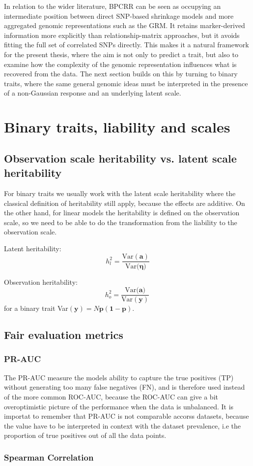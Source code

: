 In relation to the wider literature, BPCRR can be seen as occupying an intermediate position between direct SNP-based shrinkage models and more aggregated genomic representations such as the GRM. It retains marker-derived information more explicitly than relationship-matrix approaches, but it avoids fitting the full set of correlated SNPs directly. This makes it a natural framework for the present thesis, where the aim is not only to predict a trait, but also to examine how the complexity of the genomic representation influences what is recovered from the data. The next section builds on this by turning to binary traits, where the same general genomic ideas must be interpreted in the presence of a non-Gaussian response and an underlying latent scale.

\section{Binary traits, liability and scales}

\subsection{Observation scale heritability vs. latent scale heritability}

For binary traits we usually work with the latent scale heritability where the classical definition of heritability still apply, because the effects are additive. On the other hand, for linear models the heritability is defined on the observation scale, so we need to be able to do the transformation from the liability to the observation scale.

Latent heritability:
$$
h^2_l = \frac{\text{Var}(\mathbf{a})}{\text{Var}(\boldsymbol{\eta)}}
$$

Observation heritability:
$$
h^2_o = \frac{\text{Var}(\mathbf{a)}}{\text{Var}(\mathbf{y})} \, 
$$
for a binary trait Var$(\mathbf{y}) = N\mathbf{p}(\mathbf{1} - \mathbf{p})$. 

\subsection{Fair evaluation metrics}

\subsubsection{PR-AUC}

The PR-AUC measure the models ability to capture the true positives (TP) without generating too many false negatives (FN), and is therefore used instead of the more common ROC-AUC, because the ROC-AUC can give a bit overoptimistic picture of the performance when the data is unbalanced. It is importat to remember that PR-AUC is not comparable accorss datasets, because the value have to be interpreted in context with the dataset prevalence, i.e the proportion of true positives out of all the data points. 

\subsubsection{Spearman Correlation}

